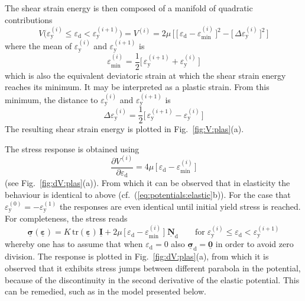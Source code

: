 \documentclass[times,namecite]{goose-article}
\newcommand\T[1]{\underline{\bm{{#1}}}}
\begin{document}
The shear strain energy is then composed of a manifold of quadratic contributions
\begin{equation}\label{eq:V-plas}
  V \big(
    \varepsilon_\mathrm{y}^{(i)} \leq \varepsilon_\mathrm{d} < \varepsilon_\mathrm{y}^{(i+1)}
  \big)
  =
  V^{(i)}
  =
  2 \mu \, \bigg[\,
    \Big[\, \varepsilon_\mathrm{d} - \varepsilon_\mathrm{min}^{(i)} \,\Big]^2
    -
    \Big[\, \Delta \varepsilon_\mathrm{y}^{(i)} \,\Big]^2
  \,\bigg]
\end{equation}
where the mean of $\varepsilon_\mathrm{y}^{(i)}$ and $\varepsilon_\mathrm{y}^{(i+1)}$ is
\begin{equation}
  \varepsilon_\mathrm{min}^{(i)}
  =
  \frac{1}{2} \Big[\, \varepsilon_\mathrm{y}^{(i+1)} + \varepsilon_\mathrm{y}^{(i)} \,\Big]
\end{equation}
which is also the equivalent deviatoric strain at which the shear strain energy reaches its minimum. It may be interpreted as a plastic strain. From this minimum, the distance to $\varepsilon_\mathrm{y}^{(i)}$ and $\varepsilon_\mathrm{y}^{(i+1)}$ is
\begin{equation}
  \Delta \varepsilon_\mathrm{y}^{(i)}
  =
  \frac{1}{2} \Big[\, \varepsilon_\mathrm{y}^{(i+1)} - \varepsilon_\mathrm{y}^{(i)} \,\Big]
\end{equation}
The resulting shear strain energy is plotted in Fig.~\ref{fig:V:plas}(a).

The stress response is obtained using
\begin{equation}\label{eq:dV-plas}
  \frac{\partial V^{(i)}}{\partial \varepsilon_\mathrm{d}}
  =
  4 \mu \, \Big[\, \varepsilon_\mathrm{d} - \varepsilon_\mathrm{min}^{(i)} \,\Big]
\end{equation}
(see Fig.~\ref{fig:dV:plas}(a)). From which it can be observed that in elasticity the behaviour is identical to above (cf.~(\ref{eq:potentials:elastic}b)). For the case that $\varepsilon_\mathrm{y}^{(0)} = - \varepsilon_\mathrm{y}^{(1)}$ the responses are even identical until initial yield stress is reached. For completeness, the stress reads
\begin{equation}
  \T{\sigma} ( \T{\varepsilon} )
  =
  K \, \text{tr} ( \T{\varepsilon} ) \, \T{I}
  +
  2 \mu \, \Big[\, \varepsilon_\mathrm{d} - \varepsilon_\mathrm{min}^{(i)} \,\Big] \;
  \T{N}_\mathrm{d}
  \qquad
  \mathrm{for}
  \;
  \varepsilon_\mathrm{y}^{(i)} \leq \varepsilon_\mathrm{d} < \varepsilon_\mathrm{y}^{(i+1)}
\end{equation}
whereby one has to assume that when $\varepsilon_\mathrm{d} = 0$ also $\T{\sigma}_\mathrm{d} = \T{0}$ in order to avoid zero division. The response is plotted in Fig.~\ref{fig:dV:plas}(a), from which it is observed that it exhibits stress jumps between different parabola in the potential, because of the discontinuity in the second derivative of the elastic potential. This can be remedied, such as in the model presented below.
\end{document}
